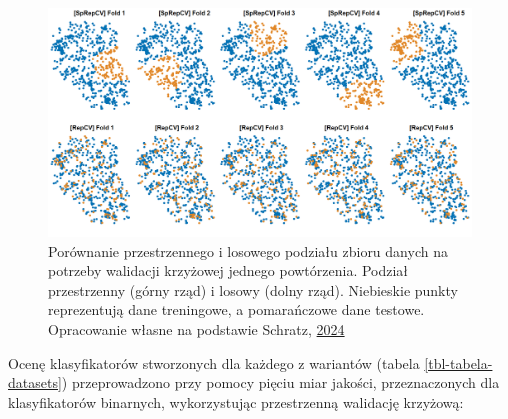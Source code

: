 \documentclass{amuthesis}
\begin{document}
\begin{figure}[t]

{\centering \includegraphics[width=1\textwidth,height=\textheight]{figures/spcv_plot.png}

}

\caption{\label{fig-rycina-spcv}Porównanie przestrzennego i losowego
podziału zbioru danych na potrzeby walidacji krzyżowej jednego
powtórzenia. Podział przestrzenny (górny rząd) i losowy (dolny rząd).
Niebieskie punkty reprezentują dane treningowe, a pomarańczowe dane
testowe. Opracowanie własne na podstawie Schratz,
\href{https://mlr.mlr-org.com/articles/tutorial/handling_of_spatial_data.html}{2024}}

\end{figure}

Ocenę klasyfikatorów stworzonych dla każdego z wariantów (tabela
\ref{tbl-tabela-datasets}) przeprowadzono przy pomocy pięciu miar
jakości, przeznaczonych dla klasyfikatorów binarnych, wykorzystując
przestrzenną walidację krzyżową:
\end{document}
